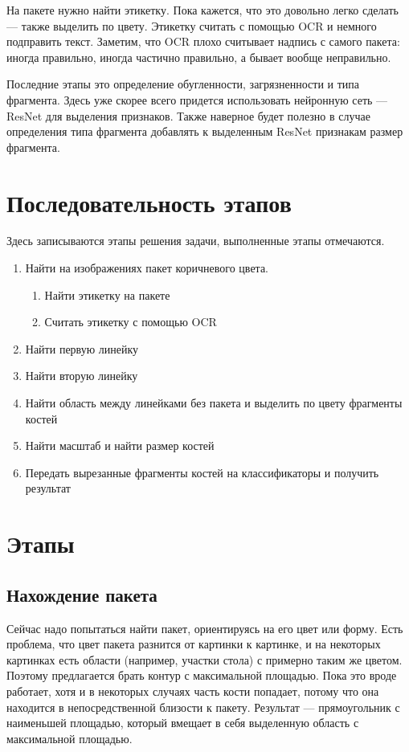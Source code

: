 \documentclass[a4paper]{article}
\begin{document}
На пакете нужно найти этикетку. Пока кажется, что это довольно легко сделать --- также выделить по цвету. Этикетку считать с помощью OCR и немного подправить текст. Заметим, что OCR плохо считывает надпись с самого пакета: иногда правильно, иногда частично правильно, а бывает вообще неправильно.


Последние этапы это определение обугленности, загрязненности и типа фрагмента. Здесь уже скорее всего придется использовать нейронную сеть --- ResNet для выделения признаков. Также наверное будет полезно в случае определения типа фрагмента добавлять к выделенным ResNet признакам размер фрагмента.


\section{Последовательность этапов}

Здесь записываются этапы решения задачи, выполненные этапы отмечаются.



\begin{enumerate}
	\item Найти на изображениях пакет коричневого цвета.
		\begin{enumerate}
			\item Найти этикетку на пакете 
			\item Считать этикетку с помощью OCR
		\end{enumerate}
	\item Найти первую линейку 
	\item Найти вторую линейку 
	\item Найти область между линейками без пакета и выделить по цвету фрагменты костей
	\item Найти масштаб и найти размер костей
	\item Передать вырезанные фрагменты костей на классификаторы и получить результат
\end{enumerate}



\section{Этапы}


\subsection{Нахождение пакета}

Сейчас надо попытаться найти пакет, ориентируясь на его цвет или форму. Есть проблема, что цвет пакета разнится от картинки к картинке, и на некоторых картинках есть области (например, участки стола) с примерно таким же цветом. Поэтому предлагается брать контур с максимальной площадью. Пока это вроде работает, хотя и в некоторых случаях часть кости попадает, потому что она находится в непосредственной близости к пакету. Результат --- прямоугольник с наименьшей площадью, который вмещает в себя выделенную область с максимальной площадью.
\end{document}
